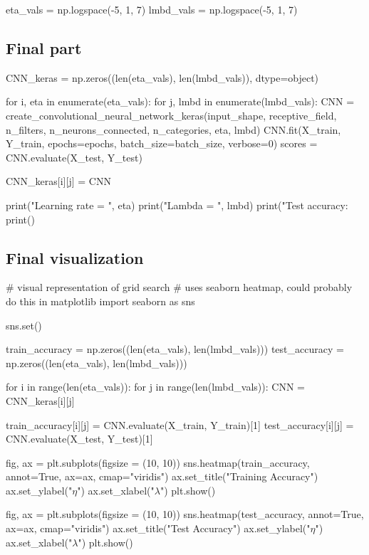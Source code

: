 \documentclass[%
oneside,                 %
final,                   %
10pt]{article}
\begin{document}
eta_vals = np.logspace(-5, 1, 7)
lmbd_vals = np.logspace(-5, 1, 7)
\epycod

\subsection{Final part}

\bpycod
CNN_keras = np.zeros((len(eta_vals), len(lmbd_vals)), dtype=object)
        
for i, eta in enumerate(eta_vals):
    for j, lmbd in enumerate(lmbd_vals):
        CNN = create_convolutional_neural_network_keras(input_shape, receptive_field,
                                              n_filters, n_neurons_connected, n_categories,
                                              eta, lmbd)
        CNN.fit(X_train, Y_train, epochs=epochs, batch_size=batch_size, verbose=0)
        scores = CNN.evaluate(X_test, Y_test)
        
        CNN_keras[i][j] = CNN
        
        print("Learning rate = ", eta)
        print("Lambda = ", lmbd)
        print("Test accuracy: %
        print()
\epycod

\subsection{Final visualization}

\bccq
# visual representation of grid search
# uses seaborn heatmap, could probably do this in matplotlib
import seaborn as sns

sns.set()

train_accuracy = np.zeros((len(eta_vals), len(lmbd_vals)))
test_accuracy = np.zeros((len(eta_vals), len(lmbd_vals)))

for i in range(len(eta_vals)):
    for j in range(len(lmbd_vals)):
        CNN = CNN_keras[i][j]

        train_accuracy[i][j] = CNN.evaluate(X_train, Y_train)[1]
        test_accuracy[i][j] = CNN.evaluate(X_test, Y_test)[1]

        
fig, ax = plt.subplots(figsize = (10, 10))
sns.heatmap(train_accuracy, annot=True, ax=ax, cmap="viridis")
ax.set_title("Training Accuracy")
ax.set_ylabel("$\eta$")
ax.set_xlabel("$\lambda$")
plt.show()

fig, ax = plt.subplots(figsize = (10, 10))
sns.heatmap(test_accuracy, annot=True, ax=ax, cmap="viridis")
ax.set_title("Test Accuracy")
ax.set_ylabel("$\eta$")
ax.set_xlabel("$\lambda$")
plt.show()
\eccq
\end{document}
